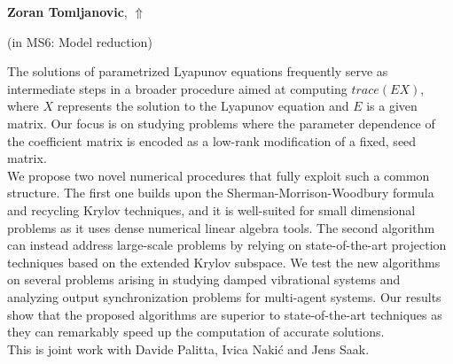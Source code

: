 \documentclass[ILAS2025-program.tex]{subfiles}
\begin{document}
\hypertarget{down0167}{}\begin{ilasabstract}
    
\textbf{Zoran Tomljanovic},  \hfill \hyperlink{up0167}{$\Uparrow$}
    
    
(in {\color{mstitle}MS6: Model reduction})
        
\mtskip
    The solutions of parametrized Lyapunov equations frequently serve as intermediate steps in a broader procedure aimed at computing $trace(EX)$, where $X$ represents the solution to the Lyapunov equation and $E$ is a given matrix. Our focus is on studying problems where the parameter dependence of the coefficient matrix is encoded as a low-rank modification of a fixed, seed matrix.\\
We propose two novel numerical procedures that fully exploit such a common structure. The first one builds upon the Sherman-Morrison-Woodbury   formula and recycling Krylov techniques, and it is well-suited for small dimensional problems as it uses dense numerical linear algebra tools. The second algorithm can instead address large-scale problems by relying on state-of-the-art projection techniques based on the extended Krylov subspace. We test the new algorithms on several problems arising in studying damped vibrational systems and analyzing output synchronization problems for multi-agent systems. Our results show that the proposed algorithms are superior to state-of-the-art techniques as they can remarkably speed up the computation of accurate solutions.\\
This is joint work with Davide Palitta, Ivica Naki\'{c} and Jens Saak.
\end{ilasabstract}
    
\end{document}
